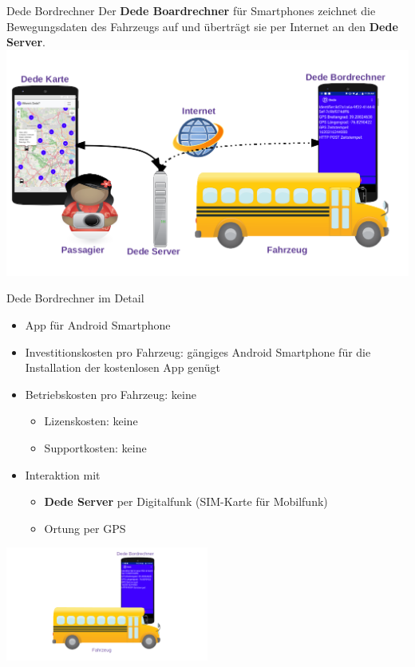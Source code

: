 
\begin{frame}{Dede Bordrechner}
  Der \textbf{Dede Boardrechner} für Smartphones zeichnet die Bewegungsdaten des Fahrzeugs auf und überträgt sie per Internet an den \textbf{Dede Server}.
  \includegraphics[width=\paperwidth]{dede/dede-concept}
\end{frame}

\begin{frame}{Dede Bordrechner im Detail}
  \begin{itemize}
  \item App für Android Smartphone
  \item Investitionskosten pro Fahrzeug: gängiges Android Smartphone für die Installation der kostenlosen App genügt
  \item Betriebskosten pro Fahrzeug: keine
    \begin{itemize}
    \item Lizenskosten: keine
    \item Supportkosten: keine
    \end{itemize}
  \item Interaktion mit
    \begin{itemize}
    \item \textbf{Dede Server} per Digitalfunk (SIM-Karte für Mobilfunk)
    \item Ortung per GPS
    \end{itemize}
  \end{itemize}
  \includegraphics[width=0.5\textwidth]{dede/dede-on-board-computer-june-04.png}
\end{frame}

